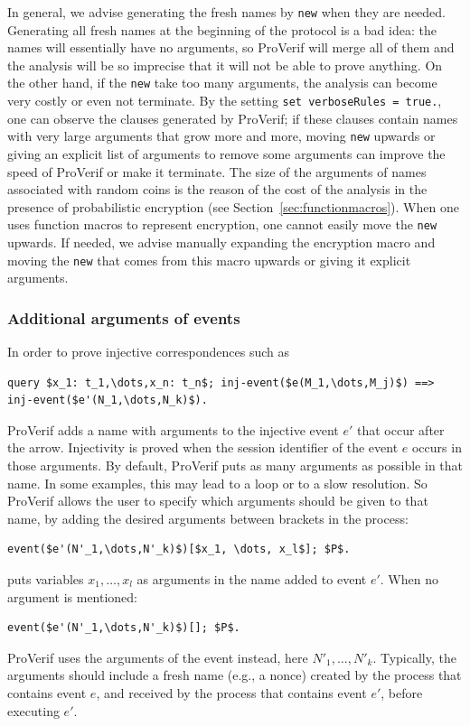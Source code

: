 \documentclass{book}
\begin{document}
In
general, we advise generating the fresh names by \lstinline!new! when
they are needed.
%
Generating all fresh names at the beginning of the protocol is a bad
idea: the names will essentially have no arguments, so ProVerif will
merge all of them and the analysis will be so imprecise that it will not be
able to prove anything. On the other hand, if the \lstinline!new! take
too many arguments, the analysis can become very costly or even not
terminate. By the setting \lstinline!set verboseRules = true.!, one
can observe the clauses generated by ProVerif; if these clauses contain
names with very large arguments that grow more and more, moving
\lstinline!new! upwards or giving an explicit list of arguments
to remove some arguments can improve the speed
of ProVerif or make it terminate. The size of the arguments of
names associated with random coins is the reason of the cost of the
analysis in the presence of probabilistic encryption
(see Section~\ref{sec:functionmacros}). When one uses function macros
to represent encryption, one cannot easily move the \lstinline!new! upwards.
If needed, we advise manually expanding the encryption macro and moving
the \lstinline!new! that comes from this macro upwards or giving it
explicit arguments.

\subsubsection{Additional arguments of events}

In order to prove injective correspondences such as
\begin{lstlisting}[numbers=none]
	query $x_1: t_1,\dots,x_n: t_n$; inj-event($e(M_1,\dots,M_j)$) ==> inj-event($e'(N_1,\dots,N_k)$).
\end{lstlisting}
ProVerif adds a name with arguments
to the injective event $e'$ that occur after the arrow. Injectivity is proved
when the session identifier of the event $e$ occurs in those arguments.
By default, ProVerif puts as many arguments as possible in that name.
In some examples, this may lead to a loop or to a slow resolution.
So ProVerif allows the user to specify which arguments should be given to that name,
by adding the desired arguments between brackets in the process:
\begin{lstlisting}[numbers=none]
	event($e'(N'_1,\dots,N'_k)$)[$x_1, \dots, x_l$]; $P$.
\end{lstlisting}
puts variables $x_1, \dots, x_l$ as arguments in the name added to event $e'$.
When no argument is mentioned:
\begin{lstlisting}[numbers=none]
	event($e'(N'_1,\dots,N'_k)$)[]; $P$.
\end{lstlisting}
ProVerif uses the arguments of the event instead, here $N'_1,\dots,N'_k$.
Typically, the arguments should include a fresh name (e.g., a nonce) created
by the process that contains event $e$, and received by the process that
contains event $e'$, before executing $e'$.
\end{document}
